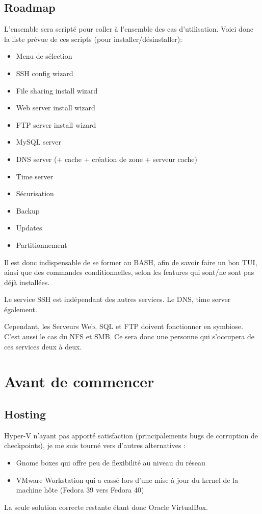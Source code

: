 \documentclass{article}
\begin{document}
	\newpage	
	
	\subsection{Roadmap}
	L'ensemble sera scripté pour coller à l'ensemble des cas d'utilisation. Voici donc la liste prévue de ces scripts (pour installer/désinstaller):
		\begin{itemize}
			\item Menu de sélection
			\item SSH config wizard
			\item File sharing install wizard
			\item Web server install wizard
			\item FTP server install wizard
			\item MySQL server 
			\item DNS server (+ cache + création de zone + serveur cache)
			\item Time server
			\item Sécurisation
			\item Backup
			\item Updates
			\item Partitionnement
		\end{itemize}
		Il est donc indispensable de se former au BASH, afin de savoir faire un bon TUI, ainsi que des commandes conditionnelles, selon les features qui sont/ne sont pas déjà installées.
		
		Le service SSH est indépendant des autres services. Le DNS, time server également.
		
		Cependant, les Serveurs Web, SQL et FTP doivent fonctionner en symbiose. C'est aussi le cas du NFS et SMB. Ce sera donc une personne qui s'occupera de ces services deux à deux.
	
	
	\section{Avant de commencer}
	
	\subsection{Hosting}
	
Hyper-V n'ayant pas apporté satisfaction (principalements bugs de corruption de checkpoints), je me suis tourné vers d'autres alternatives :
\begin{itemize}
\item Gnome boxes qui offre peu de flexibilité au niveau du réseau
\item VMware Workstation qui a cassé lors d'une mise à jour du kernel de la machine hôte (Fedora 39 vers Fedora 40)
\end{itemize}
La seule solution correcte restante étant donc Oracle VirtualBox.
	
\end{document}
